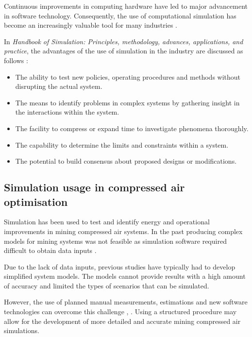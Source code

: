 		Continuous improvements in computing hardware have led to major advancement in software technology. Consequently, the use of computational simulation has become an increasingly valuable tool for many industries \cite{kocsis2003integration}.
		\par 
		In \textit{ Handbook of Simulation: Principles, methodology, advances, applications, and practice}, the advantages of the use of simulation in the industry are discussed as follows \cite{banks1998handbook}: %
		\begin{itemize}
			\item The ability to test new policies, operating procedures and methods without disrupting the actual system.
			\item The means to identify problems in complex systems by gathering insight in the interactions within the system.
			\item The facility to compress or expand time to investigate phenomena thoroughly.
			\item The capability to determine the limits and constraints within a system.
			\item The potential to build consensus about proposed designs or modifications.
		\end{itemize}

	\subsection{Simulation usage in compressed air optimisation}
		Simulation has been used to test and identify energy and operational improvements in mining compressed air systems. In the past producing complex models for mining systems was not feasible as simulation software required difficult to obtain data inputs \cite{marais2013simplification}. 
		\par 
		Due to the lack of data inputs, previous studies have typically had to develop simplified system models. The models cannot provide results with a high amount of accuracy and limited the types of scenarios that can be simulated. 
		\par 
		However, the use of planned manual measurements, estimations and new software technologies can overcome this challenge \cite{Bredenkamp2015Challeges}, \cite{Mare2017Evaluating}. Using a structured procedure may allow for the development of more detailed and accurate mining compressed air simulations.
		

